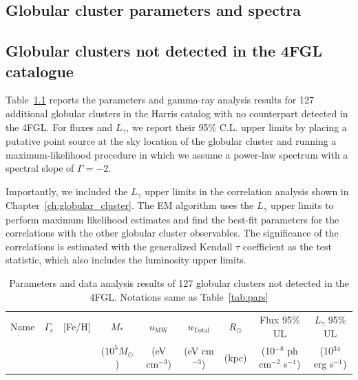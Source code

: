 \documentclass[doublespace,nopageskip]{VTthesis}
\begin{document}
\begin{appendices}



\chapter{Globular cluster parameters and spectra} \label{app:glbcs}
  
\section{Globular clusters not detected in the 4FGL catalogue}\label{appx:nodetect}

Table~\ref{tab:nondetect} reports the parameters and gamma-ray analysis results for 127 additional globular clusters in the Harris catalog with no counterpart detected in the 4FGL. For fluxes and $L_\gamma$, we report their 95\% C.L. upper limits by placing a putative point source at the sky location of the globular cluster and running a maximum-likelihood procedure in which we assume a power-law spectrum with a spectral slope of $\Gamma = -2$.

Importantly, we included the $L_\gamma$ upper limits in the correlation analysis shown in Chapter~\ref{ch:globular_cluster}. The EM algorithm uses the $L_\gamma$ upper limits to perform maximum likelihood estimates and find the best-fit parameters for the correlations with the other globular cluster observables. The significance of the correlations is estimated with the generalized Kendall $\tau$ coefficient as the test statistic, which also includes the luminosity upper limits. 

\begin{center}
\scriptsize
\begin{longtable}{lcccccccr}
\caption{Parameters and data analysis results of 127 globular clusters not detected in the 4FGL. Notations same as Table~\ref{tab:pars}}\label{tab:nondetect} \\
\hline \multicolumn{1}{c}{{Name}} & \multicolumn{1}{c}{{$\Gamma_c$}} & \multicolumn{1}{c}{{[Fe/H]}} & \multicolumn{1}{c}{{$M_*$}} & \multicolumn{1}{c}{{$u_\text{MW}$}} & \multicolumn{1}{c}{{$u_\text{Total}$}} & \multicolumn{1}{c}{{$R_\odot$}} & \multicolumn{1}{c}{{Flux 95\% UL}} & \multicolumn{1}{c}{{$L_\gamma$ 95\% UL}}\\ 
\multicolumn{1}{c}{{}} & \multicolumn{1}{c}{{}} & \multicolumn{1}{c}{{}} & \multicolumn{1}{c}{{($10^5 M_\odot$)}} & \multicolumn{1}{c}{{(eV cm$^{-3}$)}} & \multicolumn{1}{c}{{(eV cm$^{-3}$)}} & \multicolumn{1}{c}{{(kpc)}} & \multicolumn{1}{c}{{(10$^{-8}$ ph cm$^{-2}$ s$^{-1}$)}} & \multicolumn{1}{c}{{(10$^{34}$ erg s$^{-1}$)}}\\ \hline
\endfirsthead


\end{longtable}
\end{center}
\end{appendices}
\end{document}
